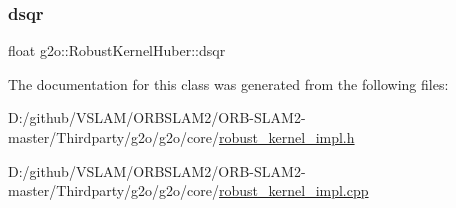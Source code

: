 \subsubsection{\texorpdfstring{dsqr}{dsqr}}
{\footnotesize\ttfamily float g2o\+::\+Robust\+Kernel\+Huber\+::dsqr\hspace{0.3cm}{\ttfamily [private]}}



The documentation for this class was generated from the following files\+:\begin{DoxyCompactItemize}
\item 
D\+:/github/\+V\+S\+L\+A\+M/\+O\+R\+B\+S\+L\+A\+M2/\+O\+R\+B-\/\+S\+L\+A\+M2-\/master/\+Thirdparty/g2o/g2o/core/\mbox{\hyperlink{robust__kernel__impl_8h}{robust\+\_\+kernel\+\_\+impl.\+h}}\item 
D\+:/github/\+V\+S\+L\+A\+M/\+O\+R\+B\+S\+L\+A\+M2/\+O\+R\+B-\/\+S\+L\+A\+M2-\/master/\+Thirdparty/g2o/g2o/core/\mbox{\hyperlink{robust__kernel__impl_8cpp}{robust\+\_\+kernel\+\_\+impl.\+cpp}}\end{DoxyCompactItemize}
